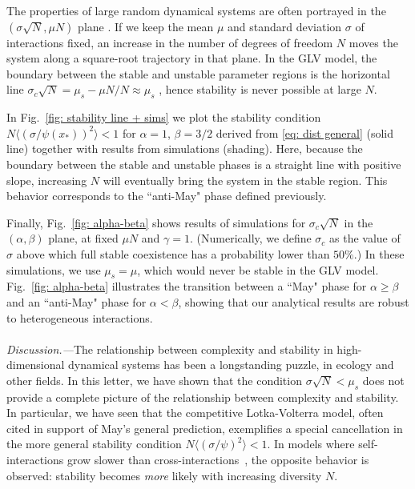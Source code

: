 \documentclass[
 prl,
 twocolumn,
 amsmath,
 amssymb,
 aps,
]{revtex4-2}
\begin{document}
The properties of large random dynamical systems are often portrayed in the $(\sigma \sqrt{N},\mu N)$ plane \cite{bunin2017ecological}.
If we keep the mean $\mu$ and standard deviation $\sigma$ of interactions fixed, an increase in the number of degrees of freedom $N$ moves the system along a square-root trajectory in that plane. In the GLV model, the boundary between the stable and unstable parameter regions is the horizontal line $\sigma_c\sqrt{N} = \mu_s - \mu N / N \approx \mu_s$ \cite{bunin2017ecological}, hence stability is never possible at large $N$. 

In Fig.~\ref{fig: stability line + sims} we plot the stability condition $N\langle (\sigma/\psi(x_*))^2\rangle < 1$ for $\alpha = 1$, $\beta = 3/2$ derived from \eqref{eq: dist general} (solid line) together with results from simulations (shading). Here, because the boundary between the stable and unstable phases is a straight line with positive slope, increasing $N$ will eventually bring the system in the stable region. This behavior corresponds to the ``anti-May" phase defined previously. 

Finally, Fig.~\ref{fig: alpha-beta} shows results of simulations for $\sigma_c\sqrt{N}$ in the $(\alpha,\beta)$ plane, at fixed $\mu N$ and $\gamma = 1$. (Numerically, we define $\sigma_c$ as the value of $\sigma$ above which full stable coexistence has a probability lower than $50\%$.) In these simulations, we use $\mu_s = \mu$, which would never be stable in the GLV model. Fig.~\ref{fig: alpha-beta} illustrates the transition between a ``May" phase for $\alpha \geq \beta$ and an ``anti-May" phase for $\alpha < \beta$, showing that our analytical results are robust to heterogeneous interactions.

\paragraph*{}
\emph{Discussion.---}The relationship between complexity and stability in high-dimensional dynamical systems has been a longstanding puzzle, in ecology and other fields. 
In this letter, we have shown that the condition $\sigma\sqrt{N}< \mu_s$ does not provide a complete picture of the relationship between complexity and stability. 
In particular, we have seen that the competitive Lotka-Volterra model, often cited in support of May's general prediction, exemplifies a special cancellation in the more general stability condition $N\langle (\sigma/\psi)^2\rangle < 1$.
In models where self-interactions grow slower than cross-interactions~\cite{Hatton2024,samadder2024interconnection}, the opposite behavior is observed: stability becomes \emph{more} likely with increasing diversity $N$.
\end{document}
